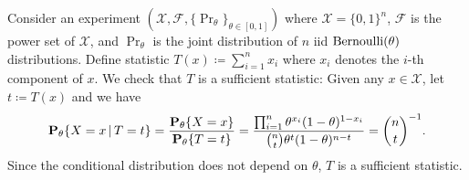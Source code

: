 \documentclass[a4paper]{article}
\begin{document}
\begin{example}\label{eg:bernoulli}
	Consider an experiment $(\mathcal{X},\mathcal{F},\{\Pr_{\theta}\}_{\theta\in[0,1]})$
	where $\mathcal{X}=\{0,1\}^{n}$,
	$\mathcal{F}$ is the power set of $\mathcal{X}$,
	and $\Pr_{\theta}$ is the joint distribution of $n$ iid $\bernoulli(\theta)$ distributions.
	Define statistic $T(x)\coloneqq\sum_{i=1}^{n}x_i$ where $x_i$ denotes the $i$-th component of $x$.
	We check that $T$ is a sufficient statistic:
	Given any $x\in\mathcal{X}$, let $t\coloneqq T(x)$ and we have
	\begin{align*}
		\pr[\theta]{X=x\given T=t}
		= \frac{ \pr[\theta]{X=x} }{ \pr[\theta]{T=t} }
		= \frac{ \prod_{i=1}^{n} \theta^{x_i} (1-\theta)^{1-x_i} } { {n\choose t}\theta^{t}(1-\theta)^{n-t} }
		= {n\choose t}\inv.
	\end{align*}
	Since the conditional distribution does not depend on $\theta$, $T$ is a sufficient statistic.
\end{example}

\end{document}
